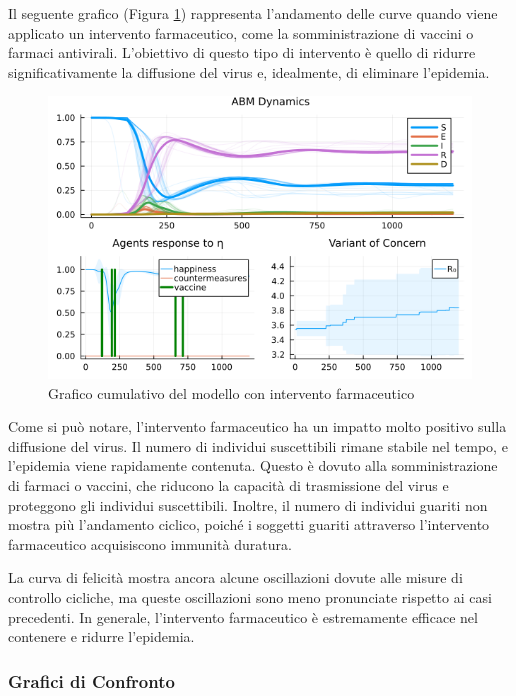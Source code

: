 Il seguente grafico (Figura \ref{fig:abm_pharm_intervent}) 
rappresenta l'andamento delle curve quando viene applicato un 
intervento farmaceutico, come la somministrazione di vaccini o 
farmaci antivirali. L'obiettivo di questo tipo di intervento è 
quello di ridurre significativamente la diffusione del virus e, 
idealmente, di eliminare l'epidemia.

\begin{figure}[H]
    \begin{center}
		\includegraphics[width=\textwidth]{img/SocialNetworkABM_VACCINE.png}
		\caption{Grafico cumulativo del modello con intervento farmaceutico}
		\label{fig:abm_pharm_intervent}
	\end{center}
\end{figure}

Come si può notare, l'intervento farmaceutico ha un impatto 
molto positivo sulla diffusione del virus. Il numero di individui 
suscettibili rimane stabile nel tempo, e l'epidemia viene rapidamente 
contenuta. Questo è dovuto alla somministrazione di farmaci o vaccini, 
che riducono la capacità di trasmissione del virus e proteggono gli 
individui suscettibili. Inoltre, il numero di individui guariti non 
mostra più l'andamento ciclico, poiché i soggetti guariti attraverso 
l'intervento farmaceutico acquisiscono immunità duratura.

La curva di felicità mostra ancora alcune oscillazioni dovute alle 
misure di controllo cicliche, ma queste oscillazioni sono meno 
pronunciate rispetto ai casi precedenti. In generale, l'intervento 
farmaceutico è estremamente efficace nel contenere e ridurre l'epidemia.

\subsubsection{Grafici di Confronto}

